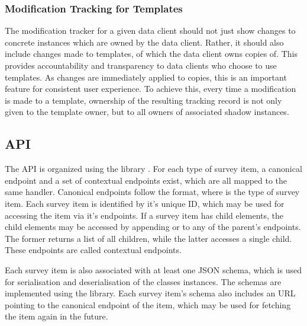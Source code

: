     \subsubsection{Modification Tracking for Templates}
        The modification tracker for a given data client should not 
        just show changes to concrete instances which are owned by
        the data client. Rather, it should also include changes
        made to templates, of which the data client owns copies of.
        This provides accountability and transparency to data clients
        who choose to use templates. As changes are immediately applied
        to copies, this is an important feature for consistent user
        experience. To achieve this, every time a modification
        is made to a template, ownership of the resulting tracking record 
        is not only given to the template owner, but to all
        owners of associated shadow instances.

\subsection{API}
    The API is organized using the 
    library \cite{flask-restful}. For each type of survey item, a canonical endpoint and a set of
    contextual endpoints exist, which are all mapped to the same handler.
    Canonical endpoints follow the  format,
    where  is the type of survey item. Each survey item is identified
    by it's unique ID, which may be used for accessing the item via it's endpoints.
    If a survey item has child elements, the child elements may be accessed by
    appending  or  to any
    of the parent's endpoints. The former returns a list of all children,
    while the latter accesses a single child. These endpoints are called
    contextual endpoints.

    Each survey item is also associated with at least one JSON schema,
    which is used for serialisation and deserialisation of the classes
    instances. The schemas are implemented using the 
    library. Each survey item's schema also includes an URL pointing to
    the canonical endpoint of the item, which may be used for
    fetching the item again in the future.

